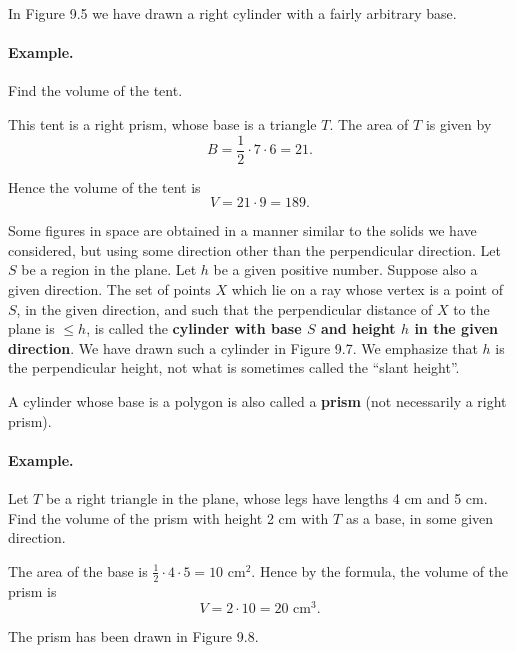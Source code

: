 \documentclass[12pt]{book} %
\begin{document}
In Figure 9.5 we have drawn a right cylinder with a fairly arbitrary base.


\paragraph{Example.}
Find the volume of the tent.


This tent is a right prism, whose base is a triangle $T$. The area of $T$ is given by
\[
B=\frac12\cdot 7\cdot 6=21.
\]

Hence the volume of the tent is
\[
V=21\cdot 9=189.
\]

Some figures in space are obtained in a manner similar to the solids we have considered, but using some direction other than the perpendicular direction. Let $S$ be a region in the plane. Let $h$ be a given positive number. Suppose also a given direction. The set of points $X$ which lie on a ray whose vertex is a point of $S$, in the given direction, and such that the perpendicular distance of $X$ to the plane is $\le h$, is called the \textbf{cylinder with base $S$ and height $h$ in the given direction}. We have drawn such a cylinder in Figure 9.7. We emphasize that $h$ is the perpendicular height, not what is sometimes called the ``slant height''.


A cylinder whose base is a polygon is also called a \textbf{prism} (not necessarily a right prism).


\paragraph{Example.}
Let $T$ be a right triangle in the plane, whose legs have lengths 4 cm and 5 cm. Find the volume of the prism with height 2 cm with $T$ as a base, in some given direction.

The area of the base is $\frac12\cdot 4\cdot 5=10\text{ cm}^2$. Hence by the formula, the volume of the prism is
\[
V=2\cdot 10=20\text{ cm}^3.
\]

The prism has been drawn in Figure 9.8.

\end{document}
